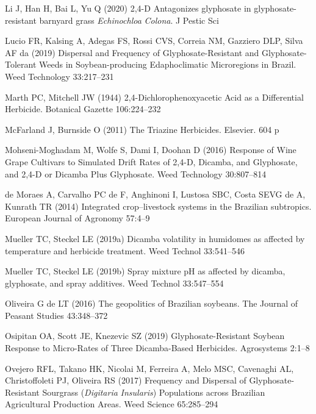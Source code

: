 \documentclass[
  12pt,
  a4paper]{article}
\begin{document}
\leavevmode\hypertarget{ref-li_24-d_2020}{}%
Li J, Han H, Bai L, Yu Q (2020) 2,4-D Antagonizes glyphosate in
glyphosate-resistant barnyard grass \emph{Echinochloa} \emph{Colona}. J
Pestic Sci

\leavevmode\hypertarget{ref-lucio_dispersal_2019}{}%
Lucio FR, Kalsing A, Adegas FS, Rossi CVS, Correia NM, Gazziero DLP,
Silva AF da (2019) Dispersal and Frequency of Glyphosate-Resistant and
Glyphosate-Tolerant Weeds in Soybean-producing Edaphoclimatic
Microregions in Brazil. Weed Technology 33:217--231

\leavevmode\hypertarget{ref-marth_24-dichlorophenoxyacetic_1944}{}%
Marth PC, Mitchell JW (1944) 2,4-Dichlorophenoxyacetic Acid as a
Differential Herbicide. Botanical Gazette 106:224--232

\leavevmode\hypertarget{ref-mcfarland_triazine_2011}{}%
McFarland J, Burnside O (2011) The Triazine Herbicides. Elsevier. 604 p

\leavevmode\hypertarget{ref-mohseni-moghadam_response_2016}{}%
Mohseni-Moghadam M, Wolfe S, Dami I, Doohan D (2016) Response of Wine
Grape Cultivars to Simulated Drift Rates of 2,4-D, Dicamba, and
Glyphosate, and 2,4-D or Dicamba Plus Glyphosate. Weed Technology
30:807--814

\leavevmode\hypertarget{ref-de_moraes_integrated_2014}{}%
de Moraes A, Carvalho PC de F, Anghinoni I, Lustosa SBC, Costa SEVG de
A, Kunrath TR (2014) Integrated crop--livestock systems in the Brazilian
subtropics. European Journal of Agronomy 57:4--9

\leavevmode\hypertarget{ref-mueller_dicamba_2019}{}%
Mueller TC, Steckel LE (2019a) Dicamba volatility in humidomes as
affected by temperature and herbicide treatment. Weed Technol
33:541--546

\leavevmode\hypertarget{ref-mueller_spray_2019}{}%
Mueller TC, Steckel LE (2019b) Spray mixture pH as affected by dicamba,
glyphosate, and spray additives. Weed Technol 33:547--554

\leavevmode\hypertarget{ref-oliveira_geopolitics_2016}{}%
Oliveira G de LT (2016) The geopolitics of Brazilian soybeans. The
Journal of Peasant Studies 43:348--372

\leavevmode\hypertarget{ref-osipitan_glyphosate-resistant_2019}{}%
Osipitan OA, Scott JE, Knezevic SZ (2019) Glyphosate-Resistant Soybean
Response to Micro-Rates of Three Dicamba-Based Herbicides. Agrosystems
2:1--8

\leavevmode\hypertarget{ref-ovejero_frequency_2017}{}%
Ovejero RFL, Takano HK, Nicolai M, Ferreira A, Melo MSC, Cavenaghi AL,
Christoffoleti PJ, Oliveira RS (2017) Frequency and Dispersal of
Glyphosate-Resistant Sourgrass (\emph{Digitaria} \emph{Insularis})
Populations across Brazilian Agricultural Production Areas. Weed Science
65:285--294
\end{document}
